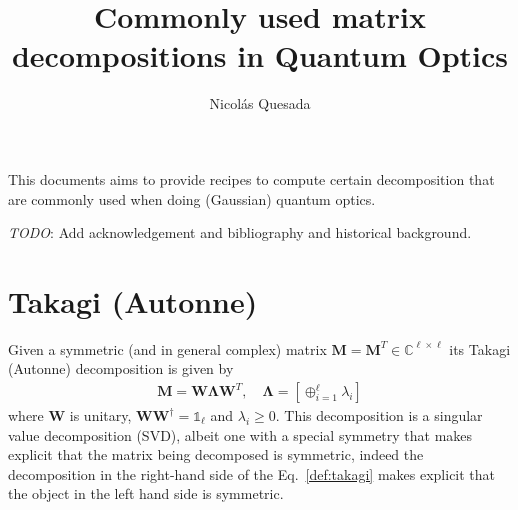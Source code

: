 \documentclass[english,12pt]{shreyasnotes}
\title{Commonly used matrix \\ decompositions in Quantum Optics}
\author{Nicol\'as Quesada}
\date{}
\begin{document}
\maketitle
\thispagestyle{empty}

This documents aims to provide recipes to compute certain decomposition that are commonly used when doing (Gaussian) quantum optics.


\emph{TODO}: Add acknowledgement and bibliography and historical background.

\section{Takagi (Autonne)}
Given a symmetric (and in general complex) matrix $\bm{M} = \bm{M}^T \in \mathbb{C}^{\ell \times \ell}$ its Takagi (Autonne) decomposition is given by
\begin{align}\label{def:takagi}
\bm{M} = \bm{W} \bm{\Lambda} \bm{W}^T,\quad  \bm{\Lambda} =  \left[ \oplus_{i=1}^\ell \lambda_i \right]
\end{align}
where $\bm{W}$ is unitary, $\bm{W}\bm{W}^\dagger = \mathbb{1}_\ell$ and $\lambda_i \geq 0$. This decomposition is a singular value decomposition (SVD), albeit one with a special symmetry that makes explicit that the matrix being decomposed is symmetric, indeed the decomposition in the right-hand side of the Eq.~\eqref{def:takagi} makes explicit that the object in the left hand side is symmetric.
\end{document}
